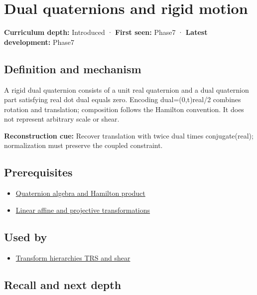 \hypertarget{appendix-d1ea57347893}{}\label{referencestart:appendix-d1ea57347893}
\section{Dual quaternions and rigid motion}\label{appendix-d1ea57347893-dual-quaternions-and-rigid-motion}

\textbf{Curriculum depth:} Introduced · \textbf{First seen:} Phase7 · \textbf{Latest development:} Phase7

\subsection{Definition and mechanism}\label{appendix-d1ea57347893-definition-and-mechanism}

A rigid dual quaternion consists of a unit real quaternion and a dual quaternion part satisfying real dot dual equals zero. Encoding dual=(0,t)real/2 combines rotation and translation; composition follows the Hamilton convention. It does not represent arbitrary scale or shear.

\textbf{Reconstruction cue:} Recover translation with twice dual times conjugate(real); normalization must preserve the coupled constraint.

\subsection{Prerequisites}\label{appendix-d1ea57347893-prerequisites}

\begin{itemize}
\tightlist
\item
  \hyperref[appendix-965d9260eeab]{Quaternion algebra and Hamilton product}
\item
  \hyperref[appendix-0bf0ca73f735]{Linear affine and projective transformations}
\end{itemize}

\subsection{Used by}\label{appendix-d1ea57347893-used-by}

\begin{itemize}
\tightlist
\item
  \hyperref[appendix-292c061cd47c]{Transform hierarchies TRS and shear}
\end{itemize}

\subsection{Recall and next depth}\label{appendix-d1ea57347893-recall-and-next-depth}

